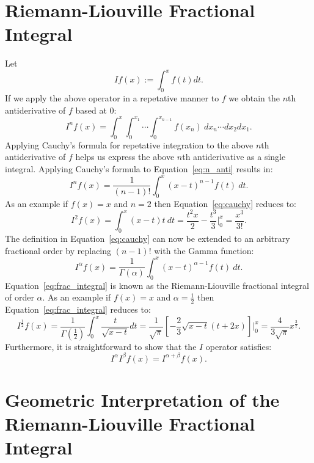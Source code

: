 \documentclass{article}
\theoremstyle{theorem}
\theoremstyle{definition}
\begin{document}
\section{Riemann-Liouville Fractional Integral}
Let
\begin{equation}
If(x) := \int_0^x f(t) dt.
\end{equation}
If we apply the above operator in a repetative manner to $f$ we obtain the $n$th antiderivative of $f$ based at 0:
\begin{equation}
\label{eq:n_anti}
I^nf(x) = \int_0^x\int_0^{x_1}\cdots \int_0^{x_{n-1}}f(x_n)~dx_n\cdots dx_2 dx_1.
\end{equation}
Applying Cauchy's formula for repetative integration to the above $n$th antiderivative of $f$ helps us express the above $n$th antiderivative as a single integral. 
Applying Cauchy's formula to Equation~\ref{eq:n_anti} results in:
\begin{equation}
\label{eq:cauchy}
I^nf(x) = \frac{1}{(n-1)!}\int_0^x (x-t)^{n-1}f(t)~dt.
\end{equation}
As an example if $f(x)=x$ and $n=2$ then Equation~\ref{eq:cauchy} reduces to:
\begin{equation}
I^2f(x) = \int_0^x (x-t)t~dt = \frac{t^2x}{2} - \frac{t^3}{3} \Bigg |_0^x = \frac{x^3}{3!}.
\end{equation}
The definition in Equation~\ref{eq:cauchy} can now be extended to an arbitrary fractional order by replacing $(n-1)!$ with the Gamma function:
\begin{equation}
\label{eq:frac_integral}
I^{\alpha}f(x) = \frac{1}{\Gamma(\alpha)}\int_0^x (x-t)^{\alpha-1}f(t)~dt.
\end{equation}
Equation~\ref{eq:frac_integral} is known as the Riemann-Liouville fractional integral of order $\alpha$. As an example if $f(x)=x$ and $\alpha=\frac{1}{2}$ then 
Equation~\ref{eq:frac_integral} reduces to:
\begin{equation}
I^{\frac{1}{2}}f(x) = \frac{1}{\Gamma(\frac{1}{2})} \int_0^x \frac{t}{\sqrt{x-t}} dt = \frac{1}{\sqrt{\pi}}\left [ -\frac{2}{3}\sqrt{x-t}(t+2x)\right] \Bigg |_0^x=\frac{4}{3\sqrt{\pi}}x^{\frac{3}{2}}. 
\end{equation}
Furthermore, it is straightforward to show that the $I$ operator satisfies:
\begin{equation}
I^{\alpha}I^{\beta}f(x) = I^{\alpha+\beta}f(x). 
\end{equation}

\section{Geometric Interpretation of the Riemann-Liouville Fractional Integral}
\end{document}
